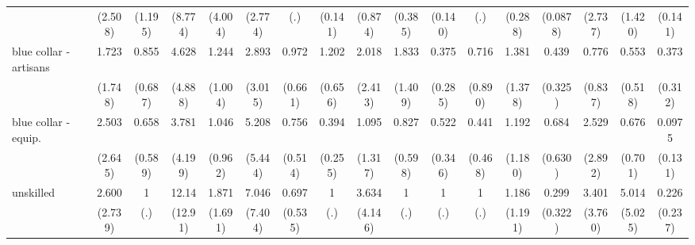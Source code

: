 {\begin{tabular}{l*{16}{c}}
                    &     (2.508)         &     (1.195)         &     (8.774)         &     (4.004)         &     (2.774)         &         (.)         &     (0.141)         &     (0.874)         &     (0.385)         &     (0.140)         &         (.)         &     (0.288)         &    (0.0878)         &     (2.737)         &     (1.420)         &     (0.141)         \\
[1em]
blue collar - artisans&       1.723         &       0.855         &       4.628         &       1.244         &       2.893         &       0.972         &       1.202         &       2.018         &       1.833         &       0.375         &       0.716         &       1.381         &       0.439         &       0.776         &       0.553         &       0.373         \\
                    &     (1.748)         &     (0.687)         &     (4.888)         &     (1.004)         &     (3.015)         &     (0.661)         &     (0.656)         &     (2.413)         &     (1.409)         &     (0.285)         &     (0.890)         &     (1.378)         &     (0.325)         &     (0.837)         &     (0.518)         &     (0.312)         \\
[1em]
blue collar - equip.&       2.503         &       0.658         &       3.781         &       1.046         &       5.208         &       0.756         &       0.394         &       1.095         &       0.827         &       0.522         &       0.441         &       1.192         &       0.684         &       2.529         &       0.676         &      0.0975         \\
                    &     (2.645)         &     (0.589)         &     (4.199)         &     (0.962)         &     (5.444)         &     (0.514)         &     (0.255)         &     (1.317)         &     (0.598)         &     (0.346)         &     (0.468)         &     (1.180)         &     (0.630)         &     (2.892)         &     (0.701)         &     (0.131)         \\
[1em]
unskilled           &       2.600         &           1         &       12.14\sym{*}  &       1.871         &       7.046         &       0.697         &           1         &       3.634         &           1         &           1         &           1         &       1.186         &       0.299         &       3.401         &       5.014         &       0.226         \\
                    &     (2.739)         &         (.)         &     (12.91)         &     (1.691)         &     (7.404)         &     (0.535)         &         (.)         &     (4.146)         &         (.)         &         (.)         &         (.)         &     (1.191)         &     (0.322)         &     (3.760)         &     (5.025)         &     (0.237)         \\

\end{tabular}}

